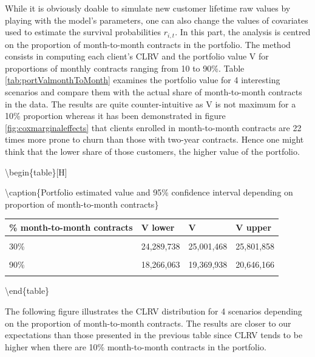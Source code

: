 \documentclass[
]{book}
\begin{document}
While it is obviously doable to simulate new customer lifetime raw values by playing with the model's parameters, one can also change the values of covariates used to estimate the survival probabilities \(r_{i,t}\). In this part, the analysis is centred on the proportion of month-to-month contracts in the portfolio. The method consists in computing each client's CLRV and the portfolio value V for proportions of monthly contracts ranging from 10 to 90\%. Table \ref{tab:portValmonthToMonth} examines the portfolio value for 4 interesting scenarios and compare them with the actual share of month-to-month contracts in the data. The results are quite counter-intuitive as V is not maximum for a 10\% proportion whereas it has been demonstrated in figure \ref{fig:coxmarginaleffects} that clients enrolled in month-to-month contracts are 22 times more prone to churn than those with two-year contracts. Hence one might think that the lower share of those customers, the higher value of the portfolio.

\textbackslash begin\{table\}{[}H{]}

\textbackslash caption\{\label{tab:portValmonthToMonth}Portfolio estimated value and 95\% confidence interval depending on proportion of month-to-month contracts\}
\centering

\begin{tabular}[t]{llll}
\toprule
\% month-to-month contracts & V lower & V & V upper\\
\midrule
\cellcolor{gray!6}{10\%} & \cellcolor{gray!6}{22,526,500} & \cellcolor{gray!6}{23,009,290} & \cellcolor{gray!6}{23,535,331}\\
30\% & 24,289,738 & 25,001,468 & 25,801,858\\
\cellcolor{gray!6}{70\%} & \cellcolor{gray!6}{19,763,605} & \cellcolor{gray!6}{20,706,782} & \cellcolor{gray!6}{21,796,005}\\
90\% & 18,266,063 & 19,369,938 & 20,646,166\\
\cellcolor{gray!6}{55.1\% (reference)} & \cellcolor{gray!6}{17,604,144} & \cellcolor{gray!6}{18,270,000} & \cellcolor{gray!6}{19,031,648}\\
\bottomrule
\end{tabular}

\textbackslash end\{table\}

The following figure illustrates the CLRV distribution for 4 scenarios depending on the proportion of month-to-month contracts. The results are closer to our expectations than those presented in the previous table since CLRV tends to be higher when there are 10\% month-to-month contracts in the portfolio.
\end{document}

